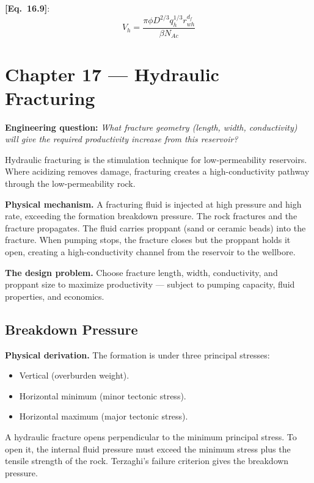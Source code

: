 \documentclass[11pt,a4paper,openany]{book}
\newcommand{\eqrefbook}[1]{\textcolor{blue!60!black}{\textbf{[Eq.~#1]}}}
\begin{document}
\eqrefbook{16.9}:
\begin{equation}
  V_h = \frac{\pi\phi D^{2/3}q_h^{1/3}r_{wh}^{d_f}}{\beta N_{Ac}}
\end{equation}

\chapter{Chapter 17 — Hydraulic Fracturing}

\begin{purpose}
\textbf{Engineering question:} \emph{What fracture geometry (length,
width, conductivity) will give the required productivity increase
from this reservoir?}

Hydraulic fracturing is the stimulation technique for low-permeability
reservoirs. Where acidizing removes damage, fracturing creates a
high-conductivity pathway through the low-permeability rock.
\end{purpose}

\begin{theory}
\textbf{Physical mechanism.} A fracturing fluid is injected at high
pressure and high rate, exceeding the formation breakdown pressure.
The rock fractures and the fracture propagates. The fluid carries
proppant (sand or ceramic beads) into the fracture. When pumping
stops, the fracture closes but the proppant holds it open, creating
a high-conductivity channel from the reservoir to the wellbore.

\textbf{The design problem.} Choose fracture length, width,
conductivity, and proppant size to maximize productivity — subject
to pumping capacity, fluid properties, and economics.
\end{theory}

\section{Breakdown Pressure}

\begin{theory}
\textbf{Physical derivation.} The formation is under three principal
stresses:
\begin{itemize}
  \item Vertical (overburden weight).
  \item Horizontal minimum (minor tectonic stress).
  \item Horizontal maximum (major tectonic stress).
\end{itemize}

A hydraulic fracture opens perpendicular to the minimum principal
stress. To open it, the internal fluid pressure must exceed the
minimum stress plus the tensile strength of the rock. Terzaghi's
failure criterion gives the breakdown pressure.
\end{theory}
\end{document}
